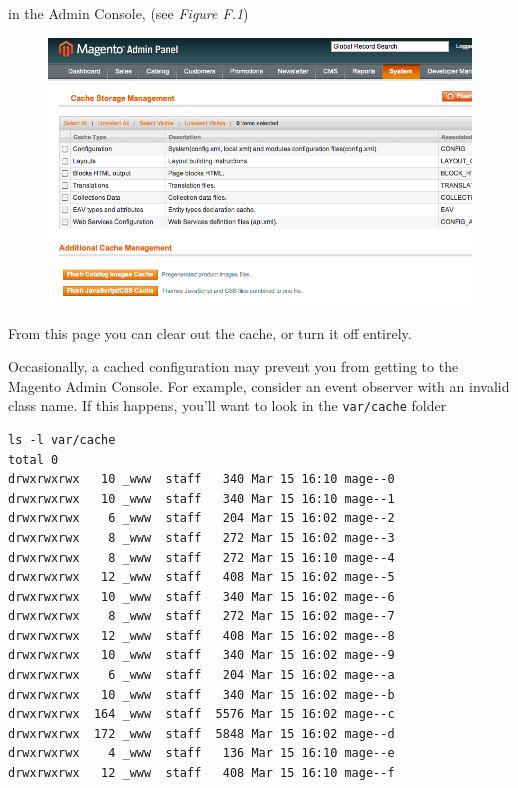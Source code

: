 \documentclass[oneside]{book}
\begin{document}
in the Admin Console, (see \emph{Figure F.1})

\begin{figure}[htb]
\begin{center}
\leavevmode
\includegraphics[width=1\textwidth]{images/appendix_f/cache-manage.png}
\end{center}
\caption{}
\end{figure}


From this page you can clear out the cache, or turn it off entirely.

Occasionally, a cached configuration may prevent you from getting to the Magento Admin Console.  For example, consider an event observer with an invalid class name.  If this happens, you'll want to look in the \footnotesize\texttt{var/cache} \normalsize  folder

\begin{lstlisting}
ls -l var/cache
total 0
drwxrwxrwx   10 _www  staff   340 Mar 15 16:10 mage--0
drwxrwxrwx   10 _www  staff   340 Mar 15 16:10 mage--1
drwxrwxrwx    6 _www  staff   204 Mar 15 16:02 mage--2
drwxrwxrwx    8 _www  staff   272 Mar 15 16:02 mage--3
drwxrwxrwx    8 _www  staff   272 Mar 15 16:10 mage--4
drwxrwxrwx   12 _www  staff   408 Mar 15 16:02 mage--5
drwxrwxrwx   10 _www  staff   340 Mar 15 16:02 mage--6
drwxrwxrwx    8 _www  staff   272 Mar 15 16:02 mage--7
drwxrwxrwx   12 _www  staff   408 Mar 15 16:02 mage--8
drwxrwxrwx   10 _www  staff   340 Mar 15 16:02 mage--9
drwxrwxrwx    6 _www  staff   204 Mar 15 16:02 mage--a
drwxrwxrwx   10 _www  staff   340 Mar 15 16:02 mage--b
drwxrwxrwx  164 _www  staff  5576 Mar 15 16:02 mage--c
drwxrwxrwx  172 _www  staff  5848 Mar 15 16:02 mage--d
drwxrwxrwx    4 _www  staff   136 Mar 15 16:10 mage--e
drwxrwxrwx   12 _www  staff   408 Mar 15 16:10 mage--f

\end{lstlisting}
\end{document}

